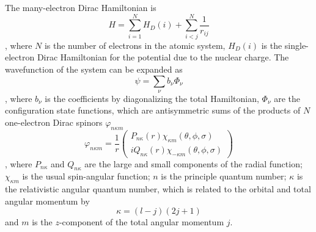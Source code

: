 The many-electron Dirac Hamiltonian is 
\begin{equation}
	H = \sum_{i=1}^N H_D(i) +\sum_{i<j}^N \frac{1}{r_{ij}}
\end{equation}
, where $N$ is the number of electrons in the atomic system, $H_D(i)$ is the single-electron Dirac Hamiltonian for the potential due to the nuclear charge. The wavefunction of the system can be expanded as
\begin{equation}
	\psi = \sum_\nu b_\nu \Phi_\nu
\end{equation}
, where $b_\nu$ is the coefficients by diagonalizing the total Hamiltonian, $\Phi_\nu$ are the configuration state functions, which are antisymmetric sums of the products of $N$ one-electron Dirac spinors $\varphi_{n\kappa m}$
\begin{equation}
	\varphi_{n\kappa m} = \frac{1}{r}
	\begin{pmatrix}
		P_{n\kappa} (r) \chi_{\kappa m}(\theta, \phi, \sigma) \\
		iQ_{n\kappa} (r) \chi_{-\kappa m}(\theta, \phi, \sigma)
	\end{pmatrix}
\end{equation}
, where $P_{n\kappa}$ and $Q_{n\kappa}$ are the large and small components of the radial function; $\chi_{\kappa m}$ is the usual spin-angular function; $n$ is the principle quantum number; $\kappa$ is the relativistic angular quantum number, which is related to the orbital and total angular momentum by
\begin{equation}
	\kappa = (l-j)(2j+1)
\end{equation}
and $m$ is the $z$-component of the total angular momentum $j$. 

